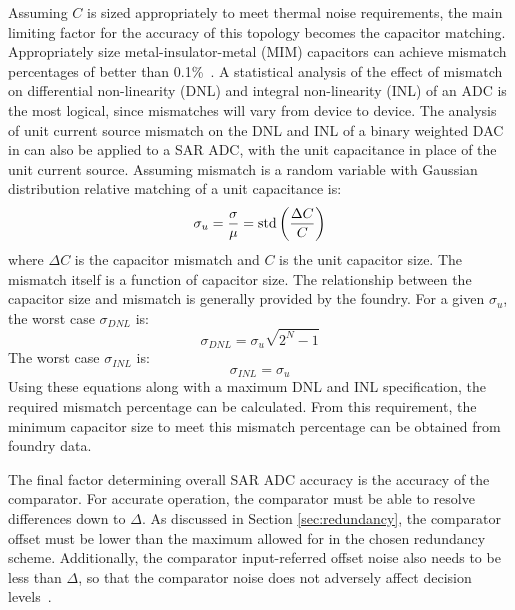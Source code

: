 Assuming $C$ is sized appropriately to meet thermal noise requirements, the main limiting factor for the accuracy of this topology becomes the capacitor matching. Appropriately size metal-insulator-metal (MIM) capacitors can achieve mismatch percentages of better than 0.1\%~\cite{1297341}. A statistical analysis of the effect of mismatch on differential non-linearity (DNL) and integral non-linearity (INL) of an ADC is the most logical, since mismatches will vary from device to device. The analysis of unit current source mismatch on the DNL and INL of a binary weighted DAC in \cite{315breader} can also be applied to a SAR ADC, with the unit capacitance in place of the unit current source. Assuming mismatch is a random variable with Gaussian distribution relative matching of a unit capacitance is:
\begin{equation}
\label{eq:caprelmatching}
\sigma_{u} = \frac{\sigma}{\mu} = \textnormal{std}\left( \frac{\Delta C}{C}\right)
\end{equation}
where $\Delta C$ is the capacitor mismatch and $C$ is the unit capacitor size. The mismatch itself is a function of capacitor size. The relationship between the capacitor size and mismatch is generally provided by the foundry. For a given $\sigma_{u}$, the worst case $\sigma_{DNL}$ is:
\begin{equation}
\label{eq:sigmadnl}
\sigma_{DNL} = \sigma_{u} \sqrt{2^N-1}
\end{equation}
The worst case $\sigma_{INL}$ is:
\begin{equation}
\label{eq:sigmainl}
\sigma_{INL} = \sigma_{u}
\end{equation}
Using these equations along with a maximum DNL and INL specification, the required mismatch percentage can be calculated. From this requirement, the minimum capacitor size to meet this mismatch percentage can be obtained from foundry data.

The final factor determining overall SAR ADC accuracy is the accuracy of the comparator. For accurate operation, the comparator must be able to resolve differences down to $\Delta$. As discussed in Section \ref{sec:redundancy}, the comparator offset must be lower than the maximum allowed for in the chosen redundancy scheme. Additionally, the comparator input-referred offset noise also needs to be less than $\Delta$, so that the comparator noise does not adversely affect decision levels~\cite{maximsaradc}. 
